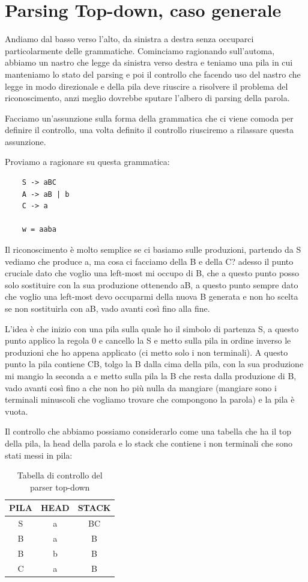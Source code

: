 \section{Parsing Top-down, caso generale}
Andiamo dal basso verso l'alto, da sinistra a destra senza occuparci particolarmente delle grammatiche.
Cominciamo ragionando sull'automa, abbiamo un nastro che legge da sinistra verso destra e teniamo una pila in cui manteniamo lo stato del parsing e poi il controllo che facendo uso del nastro che legge in modo direzionale e della pila deve riuscire a risolvere il problema del riconoscimento, anzi meglio dovrebbe sputare l'albero di parsing della parola.

Facciamo un'assunzione sulla forma della grammatica che ci viene comoda per definire il controllo, una volta definito il controllo riusciremo a rilassare questa assunzione.

Proviamo a ragionare su questa grammatica:

\begin{lstlisting}
    S -> aBC
    A -> aB | b
    C -> a

    w = aaba
\end{lstlisting}

Il riconoscimento è molto semplice se ci basiamo sulle produzioni, partendo da S vediamo che produce a, ma cosa ci facciamo della B e della C? adesso il punto cruciale dato che voglio una left-most mi occupo di B, che a questo punto posso solo sostituire con la sua produzione ottenendo aB, a questo punto sempre dato che voglio una left-most devo occuparmi della nuova B generata e non ho scelta se non sostituirla con aB, vado avanti così fino alla fine.

L'idea è che inizio con una pila sulla quale ho il simbolo di partenza S, a questo punto applico la regola 0 e cancello la S e metto sulla pila in ordine inverso le produzioni che ho appena applicato (ci metto solo i non terminali). A questo punto la pila contiene CB, tolgo la B dalla cima della pila, con la sua produzione mi mangio la seconda a e metto sulla pila la B che resta dalla produzione di B, vado avanti così fino a che non ho più nulla da mangiare (mangiare sono i terminali minuscoli che vogliamo trovare che compongono la parola) e la pila è vuota.

Il controllo che abbiamo possiamo considerarlo come una tabella che ha il top della pila, la head della parola e lo stack che contiene i non terminali che sono stati messi in pila:
\begin{table}
    \centering
    \begin{tabular}{|c|c|c|}
        \hline
        \textbf{PILA} & \textbf{HEAD} & \textbf{STACK} \\
        \hline
        S & a & BC \\
        B & a & B \\
        B & b & B \\
        C & a & B \\
        \hline
    \end{tabular}
    \caption{Tabella di controllo del parser top-down}
\end{table}

